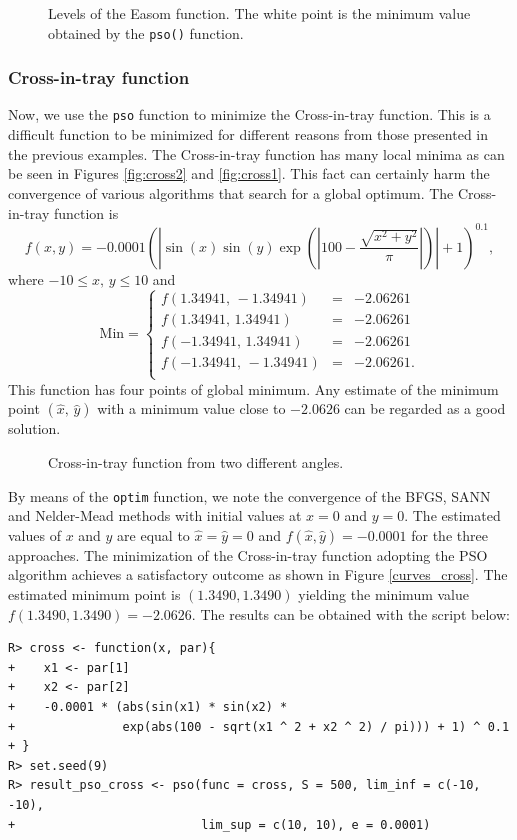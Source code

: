 \documentclass[10pt,letterpaper]{article}
\begin{document}
\begin{figure}[H]
\centering
\caption{Levels of the Easom function.
The white point is the minimum value obtained by the \texttt{pso()} function.}
\label{curves_easom}
\end{figure}

\subsubsection{Cross-in-tray function}

Now, we use the \texttt{pso} function to minimize the Cross-in-tray function.
This is a difficult function to be minimized for different reasons from
those presented in the previous examples.
The Cross-in-tray function has many local minima as  can be seen in Figures \ref{fig:cross2}
and \ref{fig:cross1}.
This fact can certainly harm the convergence of various algorithms that search for a global optimum.
The Cross-in-tray function is
$$f(x,y) = -0.0001 \left(\left| \sin(x) \sin(y) \exp\left({\left|100 - \frac{\sqrt{x^2 + y^2}}{\pi}\right|}\right)\right| +1 \right)^{0.1},$$
where $-10 \leq x,\, y \leq 10$ and
$$
\mathrm{Min} = \left\{
\begin{array}{ccc}
f(1.34941,\,-1.34941) & = & -2.06261
\\
f(1.34941,\,1.34941) & = & -2.06261
\\
f(-1.34941,\,1.34941) & = & -2.06261
\\
f(-1.34941,\,-1.34941) & = & -2.06261.
\\
\end{array}
\right.
$$
This function has four points of global minimum.
Any estimate of the minimum point $(\widehat{x},\,\widehat{y})$ with a minimum value close to $-2.0626$ can be regarded as a good solution.

\begin{figure}[H]
\centering
\subfigure{
	\label{fig:cross2}
}
\subfigure{
	\label{fig:cross1}
}
\caption{Cross-in-tray function from two different angles.}
\label{fig:cross}
\end{figure}


By means of the \texttt{optim} function, we note the convergence of the BFGS, SANN and Nelder-Mead methods with initial values at $x=0$ and $y=0$.
The estimated values of $x$ and $y$ are equal to $\widehat{x}=\widehat{y}=0$ and $f(\widehat{x},\widehat{y})=-0.0001$ for the three approaches.
The minimization of the Cross-in-tray function adopting the PSO algorithm achieves a satisfactory outcome as shown in Figure \ref{curves_cross}.
The estimated minimum point is $(1.3490,1.3490)$ yielding the minimum value $f(1.3490,1.3490) = -2.0626$.
The results can be obtained with the script below:
\begin{verbatim}
R> cross <- function(x, par){
+    x1 <- par[1]
+    x2 <- par[2]
+    -0.0001 * (abs(sin(x1) * sin(x2) *
+               exp(abs(100 - sqrt(x1 ^ 2 + x2 ^ 2) / pi))) + 1) ^ 0.1
+ }
R> set.seed(9)
R> result_pso_cross <- pso(func = cross, S = 500, lim_inf = c(-10, -10),
+                          lim_sup = c(10, 10), e = 0.0001)
\end{verbatim}
\end{document}
